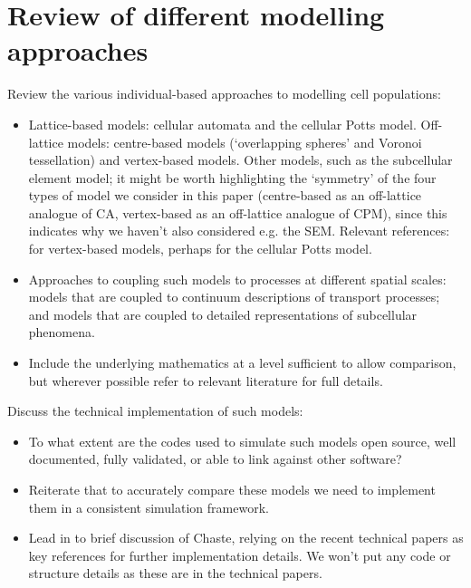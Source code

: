 \documentclass{article}
\begin{document}
\section{Review of different modelling approaches}\label{sec:discrete_models}
Review the various individual-based approaches to modelling cell populations:
\begin{itemize}
\item Lattice-based models: cellular automata and the cellular Potts model. Off-lattice models: centre-based models (`overlapping spheres' and Voronoi tessellation) and vertex-based models. Other models, such as the subcellular element model; it might be worth highlighting the `symmetry' of the four types of model we consider in this paper (centre-based as an off-lattice analogue of CA, vertex-based as an off-lattice analogue of CPM), since this indicates why we haven't also considered e.g. the SEM. Relevant references: \citet{Fletcher2012Implementing} for vertex-based models, perhaps \citet{VossBohme2012Mulit-scale} for the cellular Potts model.
\item Approaches to coupling such models to processes at different spatial scales: models that are coupled to continuum descriptions of transport processes; and models that are coupled to detailed representations of subcellular phenomena.
\item Include the underlying mathematics at a level sufficient to allow comparison, but wherever possible refer to relevant literature for full details.
\end{itemize} 

\noindent Discuss the technical implementation of such models:
\begin{itemize}
\item To what extent are the codes used to simulate such models open source, well documented, fully validated, or able to link against other software?
\item Reiterate that to accurately compare these models we need to implement them in a consistent simulation framework.
\item Lead in to brief discussion of Chaste, relying on the recent technical papers as key references for further implementation details. We won't put any code or structure details as these are in the technical papers.
\end{itemize}

\end{document}
